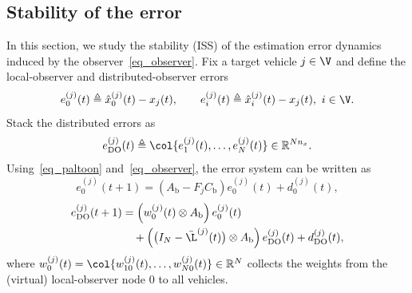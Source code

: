 


\vspace*{-0.1cm}
\subsection{Stability of the error}\label{subsec_Prove}
\vspace*{-0.2cm}
In this section, we study the stability (ISS) of the estimation error dynamics induced by the observer~\eqref{eq_observer}.
Fix a target vehicle $j\in\V$ and define the local-observer and distributed-observer errors
\begin{equation}\label{eq:def_errors}
e_0^{(j)}(t)\triangleq \hat{x}_0^{(j)}(t)-x_j(t),\qquad
e_i^{(j)}(t)\triangleq \hat{x}_i^{(j)}(t)-x_j(t),\ i\in\V.
\end{equation}
Stack the distributed errors as
\begin{equation}\label{eq:def_eDO}
e_{\mathrm{DO}}^{(j)}(t)\triangleq \col{e_1^{(j)}(t),\ldots,e_N^{(j)}(t)}\in\mathbb{R}^{Nn_x}.
\end{equation}
Using~\eqref{eq_paltoon} and~\eqref{eq_observer}, the error system can be written as
\begin{equation}\label{eq_e0}
e_0^{(j)}(t+1)=\left(A_{\text{b}}-F_jC_{\text{b}}\right)e_0^{(j)}(t)+d_0^{(j)}(t),
\end{equation}
\begin{align}\label{eq_error}
\small
e_{\mathrm{DO}}^{(j)}(t+1)
&=\Big(w_{0}^{(j)}(t)\otimes A_{\text{b}}\Big)\,e_0^{(j)}(t) \notag\\
&\quad+\Big(\big(I_{N}-\bar{\L}^{(j)}(t)\big)\otimes A_{\text{b}}\Big)\,e_{\mathrm{DO}}^{(j)}(t)
+d_{\mathrm{DO}}^{(j)}(t),
\end{align}
where $w_{0}^{(j)}(t)=\col{w_{10}^{(j)}(t),\ldots,w_{N0}^{(j)}(t)}\in\mathbb{R}^{N}$ collects the weights from the (virtual) local-observer node $0$ to all vehicles.
